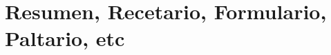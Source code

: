 \documentclass[spanish]{scrartcl}
\begin{document}
\section*{Resumen, Recetario, Formulario, Paltario, etc}




\end{document}
